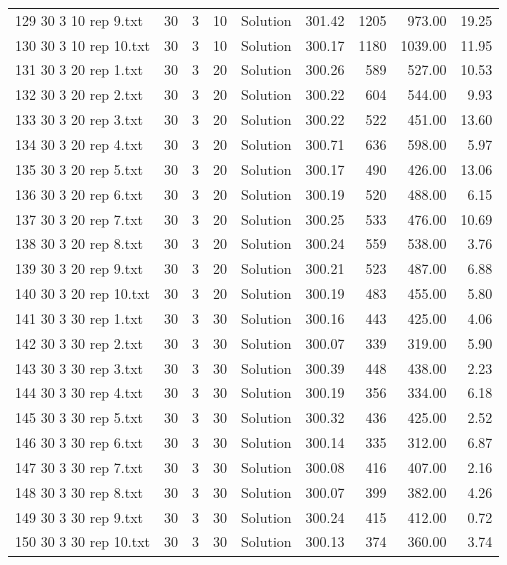 \begin{longtable}{lrrllrrrr}
129 30 3 10 rep 9.txt & 30 & 3 & 10 & Solution & 301.42 & 1205 & 973.00 & 19.25\\
130 30 3 10 rep 10.txt & 30 & 3 & 10 & Solution & 300.17 & 1180 & 1039.00 & 11.95\\
131 30 3 20 rep 1.txt & 30 & 3 & 20 & Solution & 300.26 & 589 & 527.00 & 10.53\\
132 30 3 20 rep 2.txt & 30 & 3 & 20 & Solution & 300.22 & 604 & 544.00 &  9.93\\
133 30 3 20 rep 3.txt & 30 & 3 & 20 & Solution & 300.22 & 522 & 451.00 & 13.60\\
134 30 3 20 rep 4.txt & 30 & 3 & 20 & Solution & 300.71 & 636 & 598.00 &  5.97\\
135 30 3 20 rep 5.txt & 30 & 3 & 20 & Solution & 300.17 & 490 & 426.00 & 13.06\\
136 30 3 20 rep 6.txt & 30 & 3 & 20 & Solution & 300.19 & 520 & 488.00 &  6.15\\
137 30 3 20 rep 7.txt & 30 & 3 & 20 & Solution & 300.25 & 533 & 476.00 & 10.69\\
138 30 3 20 rep 8.txt & 30 & 3 & 20 & Solution & 300.24 & 559 & 538.00 &  3.76\\
139 30 3 20 rep 9.txt & 30 & 3 & 20 & Solution & 300.21 & 523 & 487.00 &  6.88\\
140 30 3 20 rep 10.txt & 30 & 3 & 20 & Solution & 300.19 & 483 & 455.00 &  5.80\\
141 30 3 30 rep 1.txt & 30 & 3 & 30 & Solution & 300.16 & 443 & 425.00 &  4.06\\
142 30 3 30 rep 2.txt & 30 & 3 & 30 & Solution & 300.07 & 339 & 319.00 &  5.90\\
143 30 3 30 rep 3.txt & 30 & 3 & 30 & Solution & 300.39 & 448 & 438.00 &  2.23\\
144 30 3 30 rep 4.txt & 30 & 3 & 30 & Solution & 300.19 & 356 & 334.00 &  6.18\\
145 30 3 30 rep 5.txt & 30 & 3 & 30 & Solution & 300.32 & 436 & 425.00 &  2.52\\
146 30 3 30 rep 6.txt & 30 & 3 & 30 & Solution & 300.14 & 335 & 312.00 &  6.87\\
147 30 3 30 rep 7.txt & 30 & 3 & 30 & Solution & 300.08 & 416 & 407.00 &  2.16\\
148 30 3 30 rep 8.txt & 30 & 3 & 30 & Solution & 300.07 & 399 & 382.00 &  4.26\\
149 30 3 30 rep 9.txt & 30 & 3 & 30 & Solution & 300.24 & 415 & 412.00 &  0.72\\
150 30 3 30 rep 10.txt & 30 & 3 & 30 & Solution & 300.13 & 374 & 360.00 &  3.74\\

\end{longtable}
